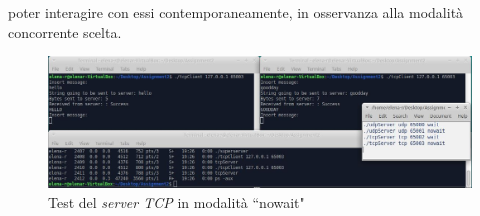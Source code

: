 \documentclass[a4paper, 12pt]{report}
\begin{document}
\begin{enumerate}
\begin{itemize}
		poter interagire con essi contemporaneamente, in osservanza alla modalità concorrente scelta.
		\begin{figure}[H]
			\centering
			\includegraphics[width=\linewidth]{images/launch_tcpClientNowait.JPG}
			\caption{Test del \textit{server TCP} in modalità ``nowait"}
		\end{figure}
	\end{itemize}
\end{enumerate}
\end{document}
